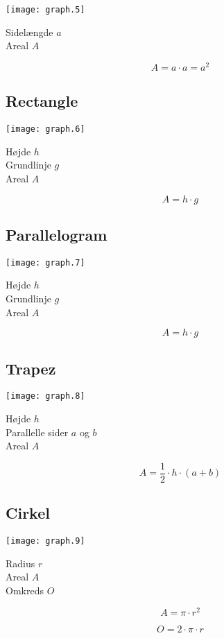 \documentclass[11pt,a4paper,landscape,twocolumn,fleqn,leqno]{article}
\begin{document}
\texttt{[image: graph.5]}

Sidelængde $a$ \\
Areal $A$

\begin{equation}
A = a \cdot a = a^2
\end{equation}

\vfill

\subsection{Rectangle}

\texttt{[image: graph.6]}

Højde $h$ \\
Grundlinje $g$ \\
Areal $A$

\begin{equation}
A = h \cdot g
\end{equation}

\vfill

\subsection{Parallelogram}

\texttt{[image: graph.7]}

Højde $h$ \\
Grundlinje $g$ \\
Areal $A$

\begin{equation}
A = h \cdot g
\end{equation}

\vfill

\subsection{Trapez}

\texttt{[image: graph.8]}

Højde $h$ \\
Parallelle sider $a$ og $b$ \\
Areal $A$

\begin{equation}
A = \frac{1}{2} \cdot h \cdot (a + b)
\end{equation}

\vfill

\subsection{Cirkel}

\texttt{[image: graph.9]}

Radius $r$ \\
Areal $A$ \\
Omkreds $O$

\begin{equation}
A = \pi \cdot r^2
\end{equation}

\begin{equation}
O = 2 \cdot \pi \cdot r
\end{equation}

\vfill
\end{document}
